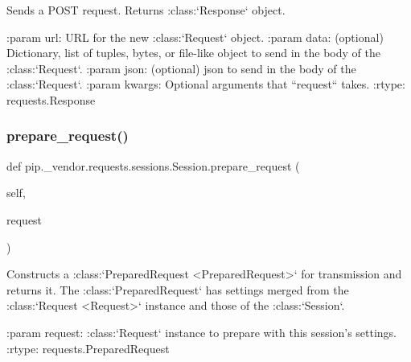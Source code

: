\begin{DoxyVerb}Sends a POST request. Returns :class:`Response` object.

:param url: URL for the new :class:`Request` object.
:param data: (optional) Dictionary, list of tuples, bytes, or file-like
    object to send in the body of the :class:`Request`.
:param json: (optional) json to send in the body of the :class:`Request`.
:param \*\*kwargs: Optional arguments that ``request`` takes.
:rtype: requests.Response
\end{DoxyVerb}
 \mbox{\label{classpip_1_1__vendor_1_1requests_1_1sessions_1_1Session_a9ff769c5610b100b08ca3a357b44eb2a}} 
\subsubsection{\texorpdfstring{prepare\+\_\+request()}{prepare\_request()}}
{\footnotesize\ttfamily def pip.\+\_\+vendor.\+requests.\+sessions.\+Session.\+prepare\+\_\+request (\begin{DoxyParamCaption}\item[{}]{self,  }\item[{}]{request }\end{DoxyParamCaption})}

\begin{DoxyVerb}Constructs a :class:`PreparedRequest <PreparedRequest>` for
transmission and returns it. The :class:`PreparedRequest` has settings
merged from the :class:`Request <Request>` instance and those of the
:class:`Session`.

:param request: :class:`Request` instance to prepare with this
    session's settings.
:rtype: requests.PreparedRequest
\end{DoxyVerb}
 \mbox{\label{classpip_1_1__vendor_1_1requests_1_1sessions_1_1Session_a4065df4d606c126c89467725707485c3}} 
